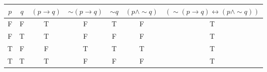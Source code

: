 \begin{tabular}{|c|c||c|c|c|c|c|}
\hline
$ p $ & $ q $ & $ (p \rightarrow q) $ & $  \sim (p \rightarrow q) $ & $  \sim q $ & $ (p \wedge  \sim q) $ & $ ( \sim (p \rightarrow q) \leftrightarrow (p \wedge  \sim q)) $ \\
\hline
F & F & T & F & T & F & T \\
F & T & T & F & F & F & T \\
T & F & F & T & T & T & T \\
T & T & T & F & F & F & T \\
\hline
\end{tabular}
